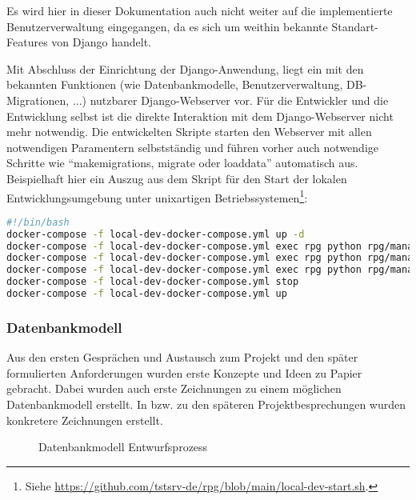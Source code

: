 Es wird hier in dieser Dokumentation auch nicht weiter auf die implementierte Benutzerverwaltung eingegangen, da es sich um weithin bekannte Standart-Features von Django handelt.

Mit Abschluss der Einrichtung der Django-Anwendung, liegt ein mit den bekannten Funktionen (wie Datenbankmodelle, Benutzerverwaltung, DB-Migrationen, ...) nutzbarer Django-Webserver vor. 
Für die Entwickler und die Entwicklung selbst ist die direkte Interaktion mit dem Django-Webserver nicht mehr notwendig. Die entwickelten Skripte starten den Webserver mit allen notwendigen Paramentern selbstständig und führen vorher auch notwendige Schritte wie \enquote{makemigrations, migrate oder loaddata} automatisch aus. Beispielhaft hier ein Auszug aus dem Skript für den Start der lokalen Entwicklungsumgebung unter unixartigen Betriebssystemen\footnote{Siehe \url{https://github.com/tstsrv-de/rpg/blob/main/local-dev-start.sh}.}: 

\begin{lstlisting}[language=bash]
#!/bin/bash
docker-compose -f local-dev-docker-compose.yml up -d
docker-compose -f local-dev-docker-compose.yml exec rpg python rpg/manage.py makemigrations
docker-compose -f local-dev-docker-compose.yml exec rpg python rpg/manage.py migrate
docker-compose -f local-dev-docker-compose.yml exec rpg python rpg/manage.py loaddata db_sample_data.json
docker-compose -f local-dev-docker-compose.yml stop
docker-compose -f local-dev-docker-compose.yml up 
\end{lstlisting}


\subsubsection{Datenbankmodell}

Aus den ersten Gesprächen und Austausch zum Projekt und den später formulierten Anforderungen wurden erste Konzepte und Ideen zu Papier gebracht. Dabei wurden auch erste Zeichnungen zu einem möglichen Datenbankmodell erstellt. In bzw. zu den späteren Projektbesprechungen wurden konkretere Zeichnungen erstellt. 

\begin{figure}[H]
    \centering
    \label{fig:henning-entwurf-datenbankmodell}
    \caption{Datenbankmodell Entwurfsprozess}
\end{figure}

